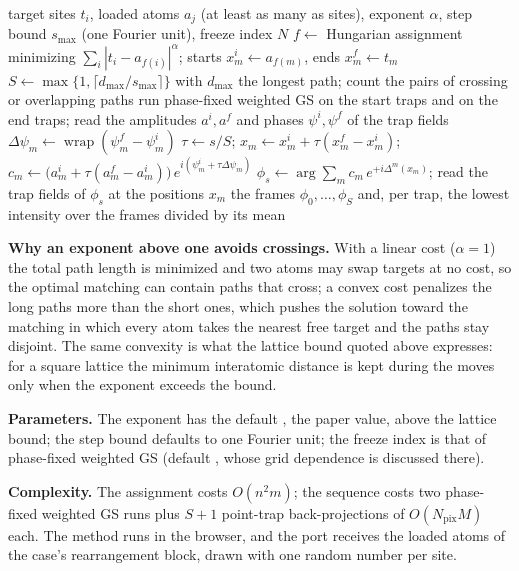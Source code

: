 \begin{algorithm}[t]
\caption{Hungarian assignment and linear phase interpolation. The solver is the Kuhn--Munkres algorithm with potentials; every frame is the point-trap back-projection of the interpolated amplitude and phase of each tweezer.}
\label{alg:m16}
\begin{algorithmic}[1]
\Require target sites $t_i$, loaded atoms $a_j$ (at least as many as sites), exponent $\alpha$, step bound $s_{\max}$ (one Fourier unit), freeze index $N$
\State $f\gets$ Hungarian assignment minimizing $\sum_i|t_i-a_{f(i)}|^\alpha$; starts $x^i_m\gets a_{f(m)}$, ends $x^f_m\gets t_m$
\State $S\gets\max\{1,\lceil d_{\max}/s_{\max}\rceil\}$ with $d_{\max}$ the longest path; count the pairs of crossing or overlapping paths
\State run phase-fixed weighted GS on the start traps and on the end traps; read the amplitudes $a^i,a^f$ and phases $\psi^i,\psi^f$ of the trap fields
\State $\Delta\psi_m\gets\operatorname{wrap}(\psi^f_m-\psi^i_m)$
  \State $\tau\gets s/S$; $x_m\gets x^i_m+\tau(x^f_m-x^i_m)$; $c_m\gets\big(a^i_m+\tau(a^f_m-a^i_m)\big)\,e^{i(\psi^i_m+\tau\Delta\psi_m)}$
  \State $\phi_s\gets\arg\sum_mc_m\,e^{+i\Delta^m(x_m)}$; read the trap fields of $\phi_s$ at the positions $x_m$
\EndFor
\State \Return the frames $\phi_0,\dots,\phi_S$ and, per trap, the lowest intensity over the frames divided by its mean
\end{algorithmic}
\end{algorithm}

\textbf{Why an exponent above one avoids crossings.} With a linear cost ($\alpha=1$) the total path length is minimized and two atoms may swap targets at no cost, so the optimal matching can contain paths that cross; a convex cost penalizes the long paths more than the short ones, which pushes the solution toward the matching in which every atom takes the nearest free target and the paths stay disjoint. The same convexity is what the lattice bound quoted above expresses: for a square lattice the minimum interatomic distance is kept during the moves only when the exponent exceeds the bound.

\textbf{Parameters.} The exponent has the default , the paper value, above the lattice bound; the step bound defaults to one Fourier unit; the freeze index is that of phase-fixed weighted GS (default , whose grid dependence is discussed there).

\textbf{Complexity.} The assignment costs $O(n^2m)$; the sequence costs two phase-fixed weighted GS runs plus $S+1$ point-trap back-projections of $O(N_{\mathrm{pix}}M)$ each. The method runs in the browser, and the port receives the loaded atoms of the case's rearrangement block, drawn with one random number per site.

